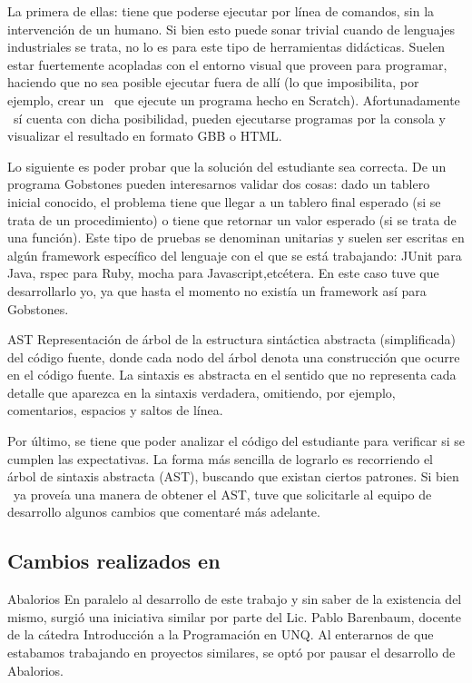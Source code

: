 La primera de ellas: tiene que poderse ejecutar por línea de comandos, sin la intervención de un humano. Si bien esto puede sonar trivial cuando de lenguajes industriales se trata, no lo es para este tipo de herramientas didácticas. Suelen estar fuertemente acopladas con el entorno visual que proveen para programar, haciendo que no sea posible ejecutar fuera de allí (lo que imposibilita, por ejemplo, crear un \runner\ que ejecute un programa hecho en Scratch). Afortunadamente \pyGob\ sí cuenta con dicha posibilidad, pueden ejecutarse programas por la consola y visualizar el resultado en formato GBB o HTML.

Lo siguiente es poder probar que la solución del estudiante sea correcta. De un programa Gobstones pueden interesarnos validar dos cosas: dado un tablero inicial conocido, el problema tiene que llegar a un tablero final esperado (si se trata de un procedimiento) o tiene que retornar un valor esperado (si se trata de una función). Este tipo de pruebas se denominan unitarias y suelen ser escritas en algún framework específico del lenguaje con el que se está trabajando: JUnit para Java, rspec para Ruby, mocha para Javascript,etcétera. En este caso tuve que desarrollarlo yo, ya que hasta el momento no existía un framework así para Gobstones.

\sepfootnotecontent
  {AST}
  {Representación de árbol de la estructura sintáctica abstracta (simplificada) del código fuente, donde cada nodo del árbol denota una construcción que ocurre en el código fuente. La sintaxis es abstracta en el sentido que no representa cada detalle que aparezca en la sintaxis verdadera, omitiendo, por ejemplo, comentarios, espacios y saltos de línea.}

Por último, se tiene que poder analizar el código del estudiante para verificar si se cumplen las expectativas. La forma más sencilla de lograrlo es recorriendo el árbol de sintaxis abstracta (AST), buscando que existan ciertos patrones. Si bien \pyGob\ ya proveía una manera de obtener el AST, tuve que solicitarle al equipo de desarrollo algunos cambios que comentaré más adelante.

\subsection{Cambios realizados en \pyGob}
\sepfootnotecontent
  {Abalorios}
  {En paralelo al desarrollo de este trabajo y sin saber de la existencia del mismo, surgió una iniciativa similar por parte del Lic. Pablo Barenbaum, docente de la cátedra Introducción a la Programación en UNQ. Al enterarnos de que estabamos trabajando en proyectos similares, se optó por pausar el desarrollo de Abalorios.}

